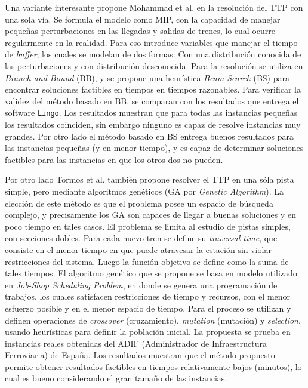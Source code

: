 \documentclass[letter, 10pt]{article}
\begin{document}
\begin{description}
    Una variante interesante propone Mohammad et al. \cite{Mohammad} en la resolución del TTP con una sola vía. Se formula el modelo como MIP, con la capacidad de manejar pequeñas perturbaciones en las llegadas y salidas de trenes, lo cual ocurre regularmente en la realidad. Para eso introduce variables que manejar el tiempo de \textit{buffer}, los cuales se modelan de dos formas: Con una distribución conocida de las perturbaciones y con distribución desconocida. Para la resolución se utiliza en \textit{Branch and Bound} (BB), y se propone una heurística \textit{Beam Search} (BS) para encontrar soluciones factibles en tiempos en tiempos razonables. Para verificar la validez del método basado en BB, se comparan con los resultados que entrega el software \texttt{Lingo}. Los resultados muestran que para todas las instancias pequeñas los resultados coinciden, sin embargo ninguno es capaz de resolve instancias muy grandes. Por otro lado el método basado en BS entrega buenos resultados para las instancias pequeñas (y en menor tiempo), y es capaz de determinar soluciones factibles para las instancias en que los otros dos no pueden.  


    Por otro lado Tormos et al. \cite{Genetic} también propone resolver el TTP en una sóla pista simple, pero mediante algoritmos genéticos (GA por \textit{Genetic Algorithm}). La elección de este método es que el problema posee un espacio de búsqueda complejo, y precisamente los GA son capaces de llegar a buenas soluciones y en poco tiempo en tales casos. El problema se limita al estudio de pistas simples, con secciones dobles. Para cada nuevo tren se define su \textit{traversal time}, que consiste en el menor tiempo en que puede atravesar la estación sin violar restricciones del sistema. Luego la función objetivo se define como la suma de tales tiempos. El algoritmo genético que se propone se basa en modelo utilizado en \textit{Job-Shop Scheduling Problem}, en donde se genera una programación de trabajos, los cuales satisfacen restricciones de tiempo y recursos, con el menor esfuerzo posible y en el menor espacio de tiempo. Para el proceso se utilizan y definen operaciones de \textit{crossover} (cruzamiento), \textit{mutation} (mutación) y \textit{selection}, usando heurísticas para definir la población inicial. La propuesta se prueba en instancias reales obtenidas del ADIF (Administrador de Infraestructura Ferroviaria) de España. Los resultados muestran que el método propuesto permite obtener resultados factibles en tiempos relativamente bajos (minutos), lo cual es bueno considerando el gran tamaño de las instancias.


\end{description}
\end{document}
